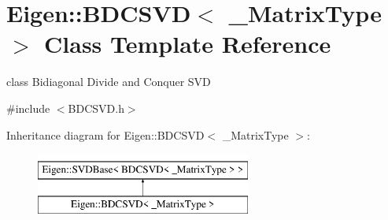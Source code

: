 \hypertarget{class_eigen_1_1_b_d_c_s_v_d}{}\section{Eigen\+::B\+D\+C\+S\+VD$<$ \+\_\+\+Matrix\+Type $>$ Class Template Reference}
\label{class_eigen_1_1_b_d_c_s_v_d}


class Bidiagonal Divide and Conquer S\+VD  




{\ttfamily \#include $<$B\+D\+C\+S\+V\+D.\+h$>$}

Inheritance diagram for Eigen\+::B\+D\+C\+S\+VD$<$ \+\_\+\+Matrix\+Type $>$\+:\begin{figure}[H]
\begin{center}
\leavevmode
\includegraphics[height=2.000000cm]{class_eigen_1_1_b_d_c_s_v_d}
\end{center}
\end{figure}

